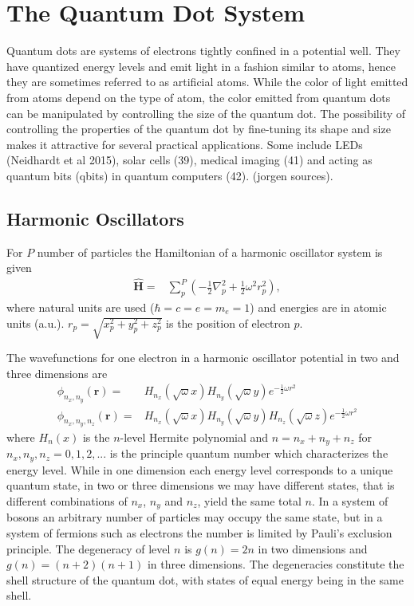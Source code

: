 \documentclass[twoside,english]{uiofysmaster}
\begin{document}
\section{The Quantum Dot System}
Quantum dots are systems of electrons tightly confined in a potential well. They have quantized energy levels and emit light in a fashion similar to atoms, hence they are sometimes referred to as artificial atoms. While the color of light emitted from atoms depend on the type of atom, the color emitted from quantum dots can be manipulated by controlling the size of the quantum dot. The possibility of controlling the properties of the quantum dot by fine-tuning its shape and size makes it attractive for several practical applications. Some include LEDs (Neidhardt et al 2015), solar cells (39), medical imaging (41) and acting as quantum bits (qbits) in quantum computers (42). (jorgen sources).

\subsection{Harmonic Oscillators}
For $P$ number of particles the Hamiltonian of a harmonic oscillator system is given 
\begin{align}
	\hat{\bm{H}} =& \sum_p^P (-\frac{1}{2} \nabla_p^2 + \frac{1}{2} \omega^2 r_p^2  ) ,
\end{align}
where natural units are used ($\hbar = c= e=m_e = 1$) and energies are in atomic units (a.u.). $r_p = \sqrt{x_p^2+y_p^2+z_p^2}$ is the position of electron $p$.

The wavefunctions for one electron in a harmonic oscillator potential in two and three dimensions are
\begin{align}
	\phi_{n_x, n_y} (\bm{r}) =& H_{n_x} (\sqrt{\omega}x) H_{n_y} (\sqrt{\omega}y) e^{-\frac{1}{2} \omega r^2} \\
	\phi_{n_x, n_y, n_z} (\bm{r}) =& H_{n_x} (\sqrt{\omega}x) H_{n_y} (\sqrt{\omega}y) H_{n_z} (\sqrt{\omega}z) e^{-\frac{1}{2} \omega r^2}
\end{align}
where $H_n(x)$ is the $n$-level Hermite polynomial and $n = n_x + n_y + n_z$ for $n_x, n_y, n_z=0,1,2,...$ is the principle quantum number which characterizes the energy level. While in one dimension each energy level corresponds to a unique quantum state, in two or three dimensions we may have different states, that is different combinations of $n_x$,  $n_y$ and $n_z$, yield the same total $n$. In a system of bosons an arbitrary number of particles may occupy the same state, but in a system of fermions such as electrons the number is limited by Pauli's exclusion principle. The degeneracy of level $n$ is $g(n) = 2n$ in two dimensions and $g(n)=(n+2)(n+1)$ in three dimensions. The degeneracies constitute the shell structure of the quantum dot, with states of equal energy being in the same shell. 
\end{document}
